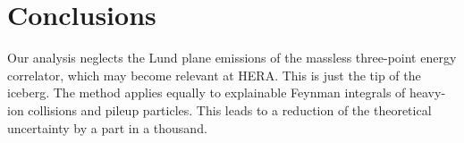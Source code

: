 \section{Conclusions}\label{sec:conclusions}

Our analysis neglects the Lund plane emissions of the massless
three-point energy correlator, which may become relevant at HERA. This
is just the tip of the iceberg. The method applies equally to
explainable Feynman integrals of heavy-ion collisions and pileup
particles. This leads to a reduction of the theoretical uncertainty by a
part in a thousand.

